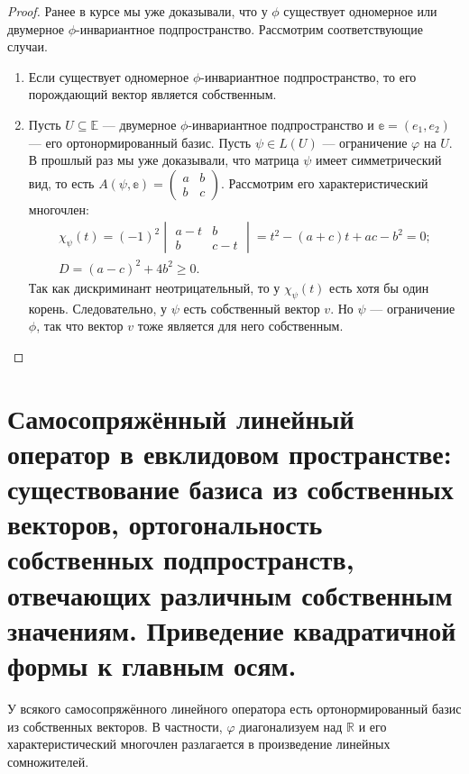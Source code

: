 \begin{proof}
	Ранее в курсе мы уже доказывали, что у $\phi$ существует одномерное или двумерное $\phi$-инвариантное подпространство. Рассмотрим соответствующие случаи.
	
\begin{enumerate}
	\item Если существует одномерное $\phi$-инвариантное подпространство, то его порождающий вектор является собственным.
	
	\item Пусть $U \subseteq \mathbb{E}$ --- двумерное $\phi$-инвариантное подпространство и $\mathbb{e} = (e_1, e_2)$ --- его ортонормированный базис. Пусть $\psi \in L(U)$ --- ограничение $\varphi$ на $U$. В прошлый раз мы уже доказывали, что матрица $\psi$ имеет симметрический вид, то есть $A(\psi, \mathbb{e}) = \begin{pmatrix}
		a& b\\
		b& c
	\end{pmatrix}$.
	Рассмотрим его характеристический многочлен:
	\begin{gather*}
	\chi_\psi(t) = (-1)^2\begin{vmatrix}
	a-t& b\\
	b& c-t
	\end{vmatrix} = t^2 - (a + c)t + ac - b^2 = 0;\\
	D = (a - c)^2 + 4b^2 \geqslant 0.
	\end{gather*}
	Так как дискриминант неотрицательный, то у $\chi_\psi(t)$ есть хотя бы один корень. Следовательно, у $\psi$ есть собственный вектор $v$. Но $\psi$ --- ограничение $\phi$, так что вектор $v$ тоже является для него собственным.
\end{enumerate}

\end{proof}

\section{Самосопряжённый линейный оператор в евклидовом пространстве: существование базиса из собственных векторов, ортогональность собственных подпространств, отвечающих различным собственным значениям. Приведение квадратичной формы к главным осям.}

\begin{Theorem}
	У всякого самосопряжённого линейного оператора есть ортонормированный базис из собственных векторов. В частности, $\varphi$ диагонализуем над $\mathbb{R}$ и его характеристический многочлен разлагается в произведение линейных сомножителей.
\end{Theorem}


